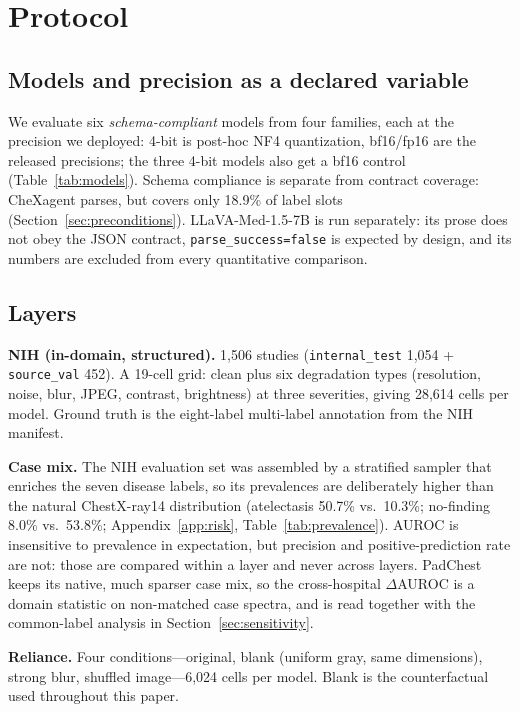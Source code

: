 \section{Protocol}
\label{sec:protocol}

\subsection{Models and precision as a declared variable}

We evaluate six \emph{schema-compliant} models from four families, each at the precision we deployed: 4-bit is post-hoc NF4 quantization, bf16/fp16 are the released precisions; the three 4-bit models also get a bf16 control (Table~\ref{tab:models}). Schema compliance is separate from contract coverage: CheXagent parses, but covers only 18.9\% of label slots (Section~\ref{sec:preconditions}). LLaVA-Med-1.5-7B is run separately: its prose does not obey the JSON contract, \texttt{parse\_success=false} is expected by design, and its numbers are excluded from every quantitative comparison.

\subsection{Layers}

\textbf{NIH (in-domain, structured).} 1,506 studies (\texttt{internal\_test} 1,054 + \texttt{source\_val} 452). A 19-cell grid: clean plus six degradation types (resolution, noise, blur, JPEG, contrast, brightness) at three severities, giving 28,614 cells per model. Ground truth is the eight-label multi-label annotation from the NIH manifest.

\textbf{Case mix.} The NIH evaluation set was assembled by a stratified sampler that enriches the seven disease labels, so its prevalences are deliberately higher than the natural ChestX-ray14 distribution (atelectasis 50.7\% vs.\ 10.3\%; no-finding 8.0\% vs.\ 53.8\%; Appendix~\ref{app:risk}, Table~\ref{tab:prevalence}). AUROC is insensitive to prevalence in expectation, but precision and positive-prediction rate are not: those are compared within a layer and never across layers. PadChest keeps its native, much sparser case mix, so the cross-hospital $\Delta$AUROC is a domain statistic on non-matched case spectra, and is read together with the common-label analysis in Section~\ref{sec:sensitivity}.

\textbf{Reliance.} Four conditions---original, blank (uniform gray, same dimensions), strong blur, shuffled image---6,024 cells per model. Blank is the counterfactual used throughout this paper.

